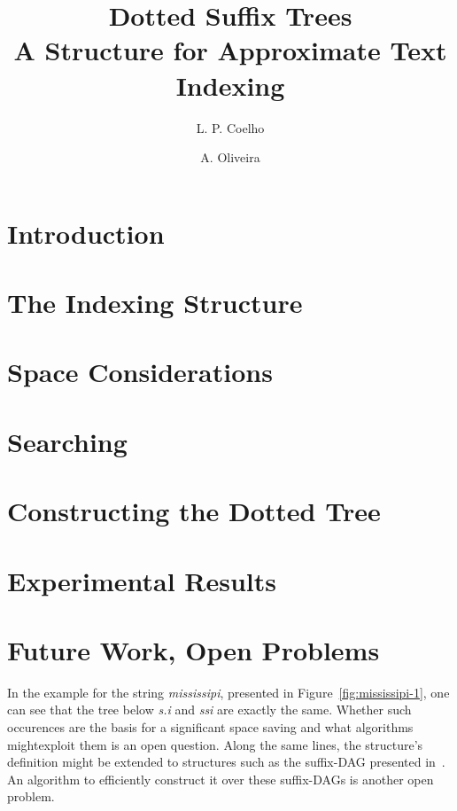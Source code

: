 \documentclass[letter,10pt]{article}
\title{Dotted Suffix Trees\\A Structure for Approximate Text Indexing}
\author{L. P. Coelho \and A. Oliveira}
\newcommand{\putstring}[1]{\textsl{#1}}
\begin{document}
\maketitle

\begin{abstract}

\end{abstract}

\section{Introduction}


\section{The Indexing Structure}

\section{Space Considerations}

\section{Searching}

\section{Constructing the Dotted Tree}

\section{Experimental Results}

\section{Future Work, Open Problems}

In the example for the string \putstring{mississipi}, presented in Figure~\ref{fig:mississipi-1}, one can see that the tree below \putstring{s.i} and \putstring{ssi} are exactly the same. Whether such occurences are the basis for a significant space saving and what algorithms mightexploit them is an open question.
Along the same lines, the structure's definition might be extended to structures such as the suffix-DAG presented in~\cite[7.7]{gusfield:algorithms}. An algorithm to efficiently construct it over these suffix-DAGs is another open problem.



\end{document}
